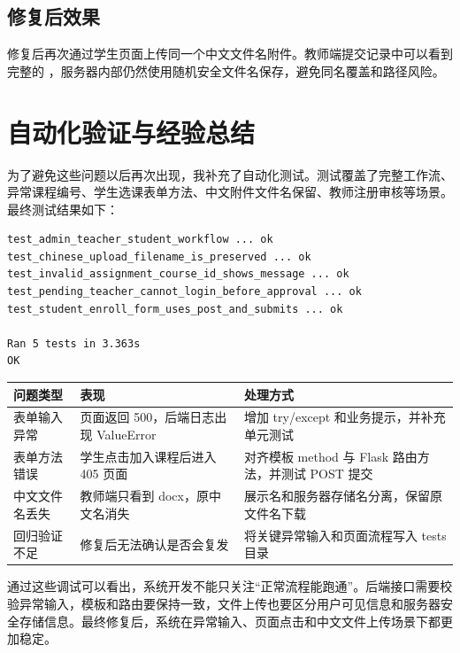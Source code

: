 \documentclass[UTF8,12pt]{ctexart}
\begin{document}
\subsection{修复后效果}

修复后再次通过学生页面上传同一个中文文件名附件。教师端提交记录中可以看到完整的 ，服务器内部仍然使用随机安全文件名保存，避免同名覆盖和路径风险。


\newpage

\section{自动化验证与经验总结}

为了避免这些问题以后再次出现，我补充了自动化测试。测试覆盖了完整工作流、异常课程编号、学生选课表单方法、中文附件文件名保留、教师注册审核等场景。最终测试结果如下：

\begin{verbatim}
test_admin_teacher_student_workflow ... ok
test_chinese_upload_filename_is_preserved ... ok
test_invalid_assignment_course_id_shows_message ... ok
test_pending_teacher_cannot_login_before_approval ... ok
test_student_enroll_form_uses_post_and_submits ... ok

Ran 5 tests in 3.363s
OK
\end{verbatim}

\begin{longtable}{p{3.2cm}p{4.6cm}p{5.8cm}}
\toprule
问题类型 & 表现 & 处理方式 \\
\midrule
表单输入异常 & 页面返回 500，后端日志出现 ValueError & 增加 try/except 和业务提示，并补充单元测试 \\
表单方法错误 & 学生点击加入课程后进入 405 页面 & 对齐模板 method 与 Flask 路由方法，并测试 POST 提交 \\
中文文件名丢失 & 教师端只看到 docx，原中文名消失 & 展示名和服务器存储名分离，保留原文件名下载 \\
回归验证不足 & 修复后无法确认是否会复发 & 将关键异常输入和页面流程写入 tests 目录 \\
\bottomrule
\end{longtable}

通过这些调试可以看出，系统开发不能只关注“正常流程能跑通”。后端接口需要校验异常输入，模板和路由要保持一致，文件上传也要区分用户可见信息和服务器安全存储信息。最终修复后，系统在异常输入、页面点击和中文文件上传场景下都更加稳定。
\end{document}

